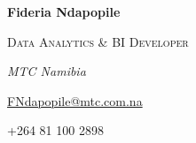 \documentclass[
  letterpaper,
  DIV=11,
  numbers=noendperiod]{scrartcl}
\begin{document}
\begin{large}
  \begin{multicols}{2}
    \begin{flushleft}\textbf{Fideria Ndapopile}\end{flushleft}
  \end{multicols}
  \vspace{-0.17cm}
  \begin{multicols}{2}
    \begin{flushleft}\textsc{Data Analytics \& BI Developer}\end{flushleft}
  \end{multicols}
  \vspace{-0.17cm}
  \begin{multicols}{2}
    \begin{flushleft}\textit{MTC Namibia}\end{flushleft}
  \end{multicols}
  \vspace{-0.17cm}
  \begin{multicols}{2}
    \begin{flushleft}\href{mailto:FNdapopile@mtc.com.na}{FNdapopile@mtc.com.na}\end{flushleft}
  \end{multicols}
  \vspace{-0.17cm}
  \begin{multicols}{2}
    \begin{flushleft}{+264 81 100 2898}\end{flushleft}
  \end{multicols}
\end{large}
\end{document}
